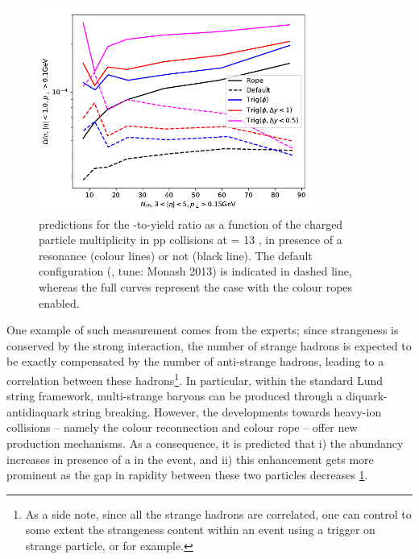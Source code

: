 \begin{figure}[t]
\centering
\includegraphics[width=0.8\textwidth]{Figs/Chapter6/PredictionPythia_Bierlich.png}
\caption{\Pythiaeight predictions for the \rmOmega-to-\rmPiPM yield ratio as a function of the charged particle multiplicity in pp collisions at \sqrtS =  13 \tev, in presence of a \rmPhiMes resonance (colour lines) or not (black line). The default \Pythia configuration (\Pythiaeight, tune: Monash 2013) is indicated in dashed line, whereas the full curves represent the case with the colour ropes enabled.}
	\label{fig:PredictionPythia_Bierlich}
\end{figure}

One example of such measurement comes from the \Pythia experts; since strangeness is conserved by the strong interaction, the number of strange hadrons is expected to be exactly compensated by the number of anti-strange hadrons, leading to a correlation between these hadrons\footnote{As a side note, since all the strange hadrons are correlated, one can control to some extent the strangeness content within an event using a trigger on strange particle, \rmXi or \rmOmega for example.}. In particular, within the standard Lund string framework, multi-strange baryons can be produced through a diquark-antidiaquark string breaking. However, the  developments towards heavy-ion collisions -- namely the colour reconnection and colour rope \cite{christiansenStringFormationLeading2015}\cite{bierlichEffectsOverlappingStrings2015a}\cite{adolfssonQCDChallengesPp2020} -- offer new production mechanisms. As a consequence, it is predicted that i) the \rmOmega abundancy increases in presence of a \rmPhiMes in the event, and ii) this enhancement gets more prominent as the gap in rapidity between these two particles decreases \fig\ref{fig:PredictionPythia_Bierlich}.

